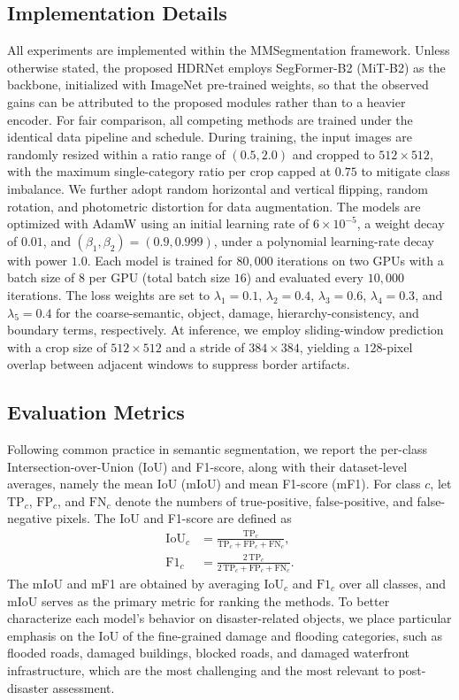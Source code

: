 \documentclass[lettersize,journal]{IEEEtran}
\begin{document}
\subsection{Implementation Details}
All experiments are implemented within the MMSegmentation framework. Unless otherwise stated, the proposed HDRNet employs SegFormer-B2 (MiT-B2) as the backbone, initialized with ImageNet pre-trained weights, so that the observed gains can be attributed to the proposed modules rather than to a heavier encoder. For fair comparison, all competing methods are trained under the identical data pipeline and schedule. During training, the input images are randomly resized within a ratio range of $(0.5, 2.0)$ and cropped to $512 \times 512$, with the maximum single-category ratio per crop capped at $0.75$ to mitigate class imbalance. We further adopt random horizontal and vertical flipping, random rotation, and photometric distortion for data augmentation. The models are optimized with AdamW using an initial learning rate of $6\times10^{-5}$, a weight decay of $0.01$, and $(\beta_1,\beta_2)=(0.9,0.999)$, under a polynomial learning-rate decay with power $1.0$. Each model is trained for $80{,}000$ iterations on two GPUs with a batch size of $8$ per GPU (total batch size $16$) and evaluated every $10{,}000$ iterations. The loss weights are set to $\lambda_1=0.1$, $\lambda_2=0.4$, $\lambda_3=0.6$, $\lambda_4=0.3$, and $\lambda_5=0.4$ for the coarse-semantic, object, damage, hierarchy-consistency, and boundary terms, respectively. At inference, we employ sliding-window prediction with a crop size of $512 \times 512$ and a stride of $384 \times 384$, yielding a $128$-pixel overlap between adjacent windows to suppress border artifacts.

\subsection{Evaluation Metrics}
Following common practice in semantic segmentation, we report the per-class Intersection-over-Union (IoU) and F1-score, along with their dataset-level averages, namely the mean IoU (mIoU) and mean F1-score (mF1). For class $c$, let $\mathrm{TP}_c$, $\mathrm{FP}_c$, and $\mathrm{FN}_c$ denote the numbers of true-positive, false-positive, and false-negative pixels. The IoU and F1-score are defined as
\begin{equation}
\begin{aligned}
\mathrm{IoU}_c&=\frac{\mathrm{TP}_c}{\mathrm{TP}_c+\mathrm{FP}_c+\mathrm{FN}_c},\\
\mathrm{F1}_c&=\frac{2\,\mathrm{TP}_c}{2\,\mathrm{TP}_c+\mathrm{FP}_c+\mathrm{FN}_c}.
\end{aligned}
\end{equation}
The mIoU and mF1 are obtained by averaging $\mathrm{IoU}_c$ and $\mathrm{F1}_c$ over all classes, and mIoU serves as the primary metric for ranking the methods. To better characterize each model's behavior on disaster-related objects, we place particular emphasis on the IoU of the fine-grained damage and flooding categories, such as flooded roads, damaged buildings, blocked roads, and damaged waterfront infrastructure, which are the most challenging and the most relevant to post-disaster assessment.
\end{document}
